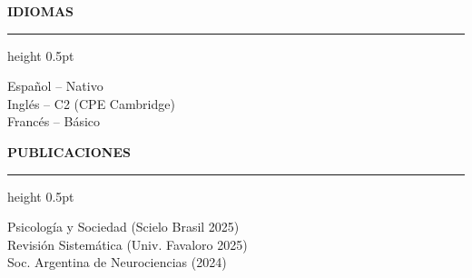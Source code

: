 \documentclass[11pt,a4paper]{article}
\newcommand{\cvtitle}[1]{ %
  {\color{primary}\bfseries\large\uppercase{ #1 }}
  {\color{accent}\hrule height 0.5pt}\vspace{6pt}
}
\begin{document}
\vspace{8pt}

\begin{minipage}[t]{0.48\textwidth}
\cvtitle{ Idiomas }
{\normalsize

Español -- Nativo \\

Inglés -- C2 (CPE Cambridge) \\

Francés -- Básico \\

}
\end{minipage}
\hfill
\begin{minipage}[t]{0.48\textwidth}
\cvtitle{ Publicaciones }
{\small

Psicología y Sociedad (Scielo Brasil 2025) \\

Revisión Sistemática (Univ. Favaloro 2025) \\

Soc. Argentina de Neurociencias (2024) \\

}
\end{minipage}
\end{document}
